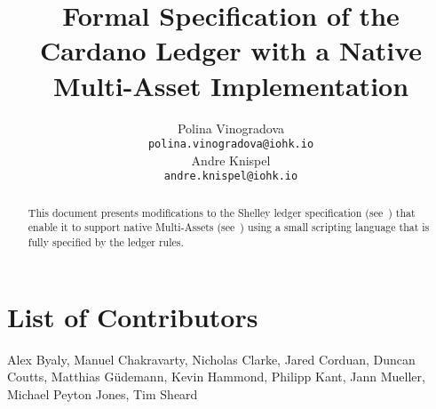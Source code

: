 
\title{Formal Specification of the Cardano Ledger with a Native
Multi-Asset Implementation}
\renewcommand{\thepage}{\arabic{page}}
\setcounter{page}{1}

\author{
   Polina Vinogradova \\ {\small \texttt{polina.vinogradova@iohk.io}} \\
   Andre Knispel \\ {\small \texttt{andre.knispel@iohk.io}} \\
   }

\date{}

\maketitle

\begin{abstract}
This document presents modifications to the Shelley ledger
specification
(see~\cite{shelley_spec}) that enable it to support native
Multi-Assets (see~\cite{multi_currency})
using a small scripting language that is fully specified
by the ledger rules.
\end{abstract}

\section*{List of Contributors}
\label{acknowledgements}

Alex Byaly,
Manuel Chakravarty,
Nicholas Clarke,
Jared Corduan,
Duncan Coutts,
Matthias G\"{u}demann,
Kevin Hammond,
Philipp Kant,
Jann Mueller,
Michael Peyton Jones,
Tim Sheard
